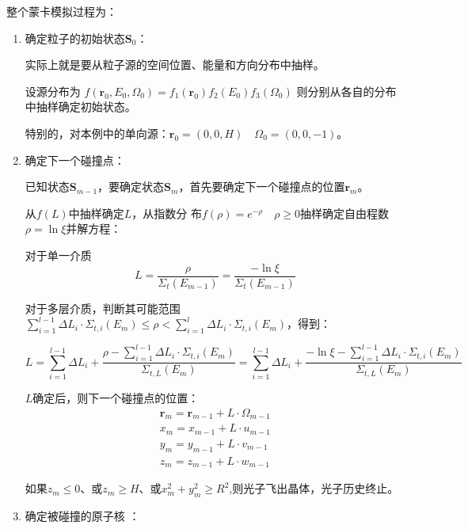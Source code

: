 \documentclass{article}
\begin{document}
整个蒙卡模拟过程为：
\begin{enumerate}[label=\Alph*.]
    \item 确定粒子的初始状态$\boldsymbol{S}_0$：
    
    实际上就是要从粒子源的空间位置、能量和方向分布中抽样。

    设源分布为
    $f(\boldsymbol{r}_0,E_0,\boldsymbol{\varOmega }_0)=f_1(\boldsymbol{r}_0)f_2(E_0)f_3(\boldsymbol{\varOmega }_0)$
    则分别从各自的分布中抽样确定初始状态。
    
    特别的，对本例中的单向源：$\boldsymbol{r}_0=(0,0,H)\quad\boldsymbol{\varOmega }_0=(0,0,-1)$。
    \item 确定下一个碰撞点：
    
    已知状态$\boldsymbol{S}_{m-1}$，要确定状态$\boldsymbol{S}_m$，首先要确定下一个碰撞点的位置$\boldsymbol{r}_m$。


    从$f(L)$中抽样确定$L$，从指数分
    布$f(\rho )=e^{-\rho }\quad \rho \geq  0$抽样确定自由程数$\rho =\ln\xi $并解方程：

    对于单一介质
    \begin{equation}
        L=\frac\rho{\Sigma_t(E_{m-1})}=\frac{-\ln\xi}{\Sigma_t(E_{m-1})}
    \end{equation}

    对于多层介质，判断其可能范围
    $\sum_{i=1}^{l-1}\Delta L_i\cdot\Sigma_{t,i}(E_m)\leq\rho<\sum_{i=1}^l\Delta L_i\cdot\Sigma_{t,i}(E_m)$，得到：

    \begin{equation}
        L=\sum_{i=1}^{l-1}\Delta L_i+\frac{\rho-\sum_{i=1}^{l-1}\Delta L_i\cdot\Sigma_{t,i}(E_m)}{\Sigma_{t,L}(E_m)}=\sum_{i=1}^{l-1}\Delta L_i+\frac{-\ln\xi -\sum_{i=1}^{l-1}\Delta L_i\cdot\Sigma_{t,i}(E_m)}{\Sigma_{t,L}(E_m)}
    \end{equation}

    $L$确定后，则下一个碰撞点的位置：
    \begin{equation}
        \begin{gathered}
            \boldsymbol{r}_m=\boldsymbol{r}_{m-1}+L\cdot\boldsymbol{\varOmega}_{m-1}\\
            x_{m}=x_{m-1}+L\cdot u_{m-1}\\
            y_{m}=y_{m-1}+L\cdot v_{m-1}\\
            z_m=z_{m-1}+L\cdot w_{m-1}
        \end{gathered}
    \end{equation}

    如果$z_m\leq0$、或$z_m\geq H$、或$x_m^2+y_m^2\geq R^2$,则光子飞出晶体，光子历史终止。
    \item 确定被碰撞的原子核 ：
    

\end{enumerate}
\end{document}
